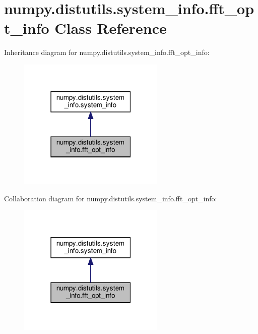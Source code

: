 \hypertarget{classnumpy_1_1distutils_1_1system__info_1_1fft__opt__info}{}\section{numpy.\+distutils.\+system\+\_\+info.\+fft\+\_\+opt\+\_\+info Class Reference}
\label{classnumpy_1_1distutils_1_1system__info_1_1fft__opt__info}


Inheritance diagram for numpy.\+distutils.\+system\+\_\+info.\+fft\+\_\+opt\+\_\+info\+:
\nopagebreak
\begin{figure}[H]
\begin{center}
\leavevmode
\includegraphics[width=198pt]{classnumpy_1_1distutils_1_1system__info_1_1fft__opt__info__inherit__graph}
\end{center}
\end{figure}


Collaboration diagram for numpy.\+distutils.\+system\+\_\+info.\+fft\+\_\+opt\+\_\+info\+:
\nopagebreak
\begin{figure}[H]
\begin{center}
\leavevmode
\includegraphics[width=198pt]{classnumpy_1_1distutils_1_1system__info_1_1fft__opt__info__coll__graph}
\end{center}
\end{figure}
